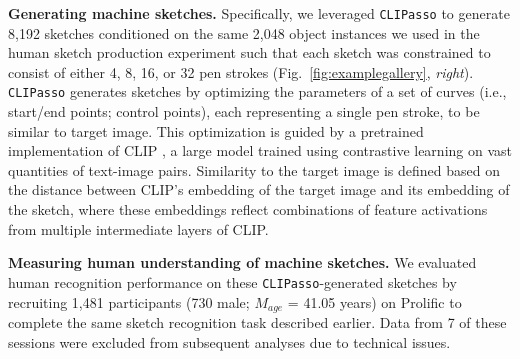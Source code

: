 \documentclass{article}
\begin{document}
\textbf{Generating machine sketches.} Specifically, we leveraged \texttt{CLIPasso} to generate 8,192 sketches conditioned on the same 2,048 object instances we used in the human sketch production experiment such that each sketch was constrained to consist of either 4, 8, 16, or 32 pen strokes (Fig.~\ref{fig:examplegallery}, \textit{right}). 
\texttt{CLIPasso} generates sketches by optimizing the parameters of a set of curves (i.e., start/end points; control points), each representing a single pen stroke, to be similar to target image.
This optimization is guided by a pretrained implementation of CLIP \cite{radford2021learning}, a large model trained using contrastive learning on vast quantities of text-image pairs.
Similarity to the target image is defined based on the distance between CLIP's embedding of the target image and its embedding of the sketch, where these embeddings reflect combinations of feature activations from multiple intermediate layers of CLIP. 

\textbf{Measuring human understanding of machine sketches.} We evaluated human recognition performance on these \texttt{CLIPasso}-generated sketches by recruiting 1,481 participants (730 male; $M_{age}$ = 41.05 years) on Prolific to complete the same sketch recognition task described earlier.
Data from 7 of these sessions were excluded from subsequent analyses due to technical issues.



\end{document}

